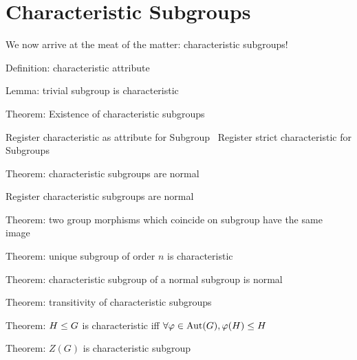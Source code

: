 \section{Characteristic Subgroups}\label{sec:characteristic:results}
We now arrive at the meat of the matter: characteristic subgroups!

\nwenddocs{}\endmoddef\nwstartdeflinemarkup{}\nwenddeflinemarkup
\LA{}Definition: \code{}characteristic\edoc{} attribute~{\nwtagstyle{}}\RA{}

\LA{}Lemma: trivial subgroup is \code{}characteristic\edoc{}~{\nwtagstyle{}}\RA{}

\LA{}Theorem: Existence of characteristic subgroups~{\nwtagstyle{}}\RA{}

\LA{}Register \code{}characteristic\edoc{} as attribute for Subgroup~{\nwtagstyle{}}\RA{}
\LA{}Register \code{}strict\edoc{} \code{}characteristic\edoc{} for Subgroups~{\nwtagstyle{}}\RA{}

\LA{}Theorem: characteristic subgroups are normal~{\nwtagstyle{}}\RA{}

\LA{}Register characteristic subgroups are normal~{\nwtagstyle{}}\RA{}

\LA{}Theorem: two group morphisms which coincide on subgroup have the same image~{\nwtagstyle{}}\RA{}

\LA{}Theorem: unique subgroup of order $n$ is \code{}characteristic\edoc{}~{\nwtagstyle{}}\RA{}

\LA{}Theorem: characteristic subgroup of a normal subgroup is normal~{\nwtagstyle{}}\RA{}

\LA{}Theorem: transitivity of characteristic subgroups~{\nwtagstyle{}}\RA{}

\LA{}Theorem: $H\leq G$ is characteristic iff $\forall\varphi\in\operatorname{Aut}(G),\varphi(H)\leq H$~{\nwtagstyle{}}\RA{}

\LA{}Theorem: $Z(G)$ is characteristic subgroup~{\nwtagstyle{}}\RA{}

